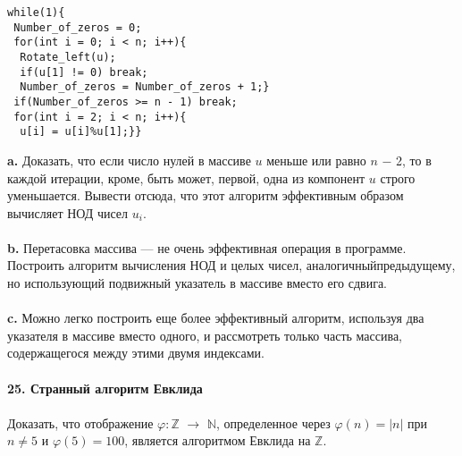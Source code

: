 \documentclass{mai_book}
\begin{document}
\begin{lstlisting}[mathescape=true]
while(1){ 
 Number_of_zeros = 0; 
 for(int i = 0; i < n; i++){ 
  Rotate_left(u); 
  if(u[1] != 0) break; 
  Number_of_zeros = Number_of_zeros + 1;} 
 if(Number_of_zeros >= n - 1) break; 
 for(int i = 2; i < n; i++){ 
  u[i] = u[i]%u[1];}}
\end{lstlisting}
 \hspace*{10pt}\textbf{a.} Доказать, что если число нулей в массиве $u$ меньше или равно \linebreak
  $n$ $-$ 2, то в каждой итерации, кроме, быть может, первой, одна из\linebreak
компонент $u$ строго уменьшается. Вывести отсюда, что этот алгоритм\linebreak
эффективным образом вычисляет НОД чисел $u_i$.\\\\
 \hspace*{10pt}\textbf{b.} Перетасовка массива — не очень эффективная операция в программе.\linebreak
 Построить алгоритм вычисления НОД и целых чисел, аналогичный\linebreak предыдущему, но использующий подвижный указатель в \linebreak массиве вместо его сдвига.\\\\
  \hspace*{10pt}\textbf{c.} Можно легко построить еще более эффективный алгоритм,\linebreak
   используя два указателя в массиве вместо одного, и рассмотреть только\linebreak
часть массива, содержащегося между этими двумя индексами.\\
\\
\noindent\textbf{25. Странный алгоритм Евклида}\\\\
\hspace*{10pt} 
Доказать, что отображение $\varphi : \mathbb{Z}$ $\rightarrow$ $\mathbb {N}$, определенное через $\varphi(n) = |n|$\linebreak
при $n \neq 5$  и $\varphi(5) = 100$, является алгоритмом Евклида на $\mathbb{Z}$.\pagebreak

\end{document}

